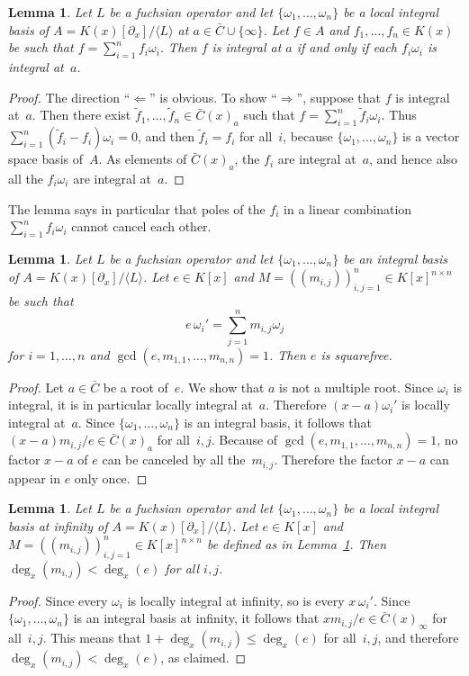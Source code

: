 \documentclass[final,1p,times,authoryear]{elsarticle}
\newtheorem{lemma}[theorem]{Lemma}
\def\<#1>{\langle#1\rangle}
\begin{document}
\begin{lemma}\label{lemma:1}
  Let $L$ be a fuchsian operator and let
  $\{\omega_1,\dots,\omega_n\}$ be a local integral basis of $A=K(x)[\partial_x]/\<L>$ at $a\in\bar C\cup\{\infty\}$.
  Let $f\in A$ and $f_1,\dots,f_n\in K(x)$ be such that $f=\sum_{i=1}^nf_i\omega_i$.
  Then $f$ is integral at $a$ if and only if each $f_i\omega_i$ is integral at~$a$.
\end{lemma}
\begin{proof}
  The direction ``$\Leftarrow$'' is obvious. To show ``$\Rightarrow$'', suppose
  that $f$ is integral at~$a$. Then there exist $\tilde{f}_1,\dots,\tilde{f}_n\in\bar C(x)_a$ such that
  $f=\sum_{i=1}^n\tilde{f}_i\omega_i$. Thus $\sum_{i=1}^n(\tilde{f}_i-f_i)\omega_i=0$, and then
  $\tilde{f}_i=f_i$ for all~$i$, because $\{\omega_1,\dots,\omega_n\}$ is a vector space basis of~$A$.
  As elements of $\bar C(x)_a$, the $f_i$ are integral at~$a$, and hence also all the $f_i\omega_i$
  are integral at~$a$.
\end{proof}

The lemma says in particular that poles of the $f_i$ in a linear combination
$\sum_{i=1}^n f_i\omega_i$ cannot cancel each other.

\begin{lemma}\label{lemma:e}
  Let $L$ be a fuchsian operator and let
  $\{\omega_1,\dots,\omega_n\}$ be an integral basis of $A=K(x)[\partial_x]/\<L>$.
  Let $e\in K[x]$ and
  $M=((m_{i,j}))_{i,j=1}^n\in K[x]^{n\times n}$ be such that
  \[
    e\,\omega_i'=\sum_{j=1}^n m_{i,j}\omega_j
  \]
  for $i=1,\dots,n$ and $\gcd(e,m_{1,1},\dots,m_{n,n})=1$.
  Then $e$ is squarefree.
\end{lemma}
\begin{proof}
  Let $a\in\bar C$ be a root of~$e$. We show that $a$ is not a multiple root.
  Since $\omega_i$ is integral, it is in particular locally integral at~$a$.
  Therefore $(x-a)\omega_i'$ is locally integral at~$a$.
  Since $\{\omega_1,\dots,\omega_n\}$ is an integral basis, it follows that
  $(x-a)m_{i,j}/e\in\bar C(x)_a$ for all~$i,j$.
  Because of $\gcd(e,m_{1,1},\dots,m_{n,n})=1$, no factor $x-a$ of $e$
  can be canceled by all the~$m_{i,j}$.
  Therefore the factor $x-a$ can appear in $e$ only once.
\end{proof}

\begin{lemma} \label{lemma:degM}
  Let $L$ be a fuchsian operator and let $\{\omega_1,\dots,\omega_n\}$ be a local integral
  basis at infinity of $A=K(x)[\partial_x]/\<L>$. Let $e\in K[x]$ and $M=((m_{i,j}))_{i,j=1}^n\in K[x]^{n\times n}$
  be defined as in Lemma~\ref{lemma:e}. Then $\deg_x(m_{i,j})<\deg_x(e)$ for all $i,j$.
\end{lemma}
\begin{proof}
  Since every $\omega_i$ is locally integral at infinity, so is every $x\,\omega_i'$.
  Since $\{\omega_1,\dots,\omega_n\}$ is an integral basis at infinity, it follows that
  $xm_{i,j}/e\in\bar C(x)_\infty$ for all~$i,j$. This means that $1+\deg_x(m_{i,j})\leq\deg_x(e)$
  for all~$i,j$, and therefore $\deg_x(m_{i,j})<\deg_x(e)$, as claimed.
\end{proof}
\end{document}
